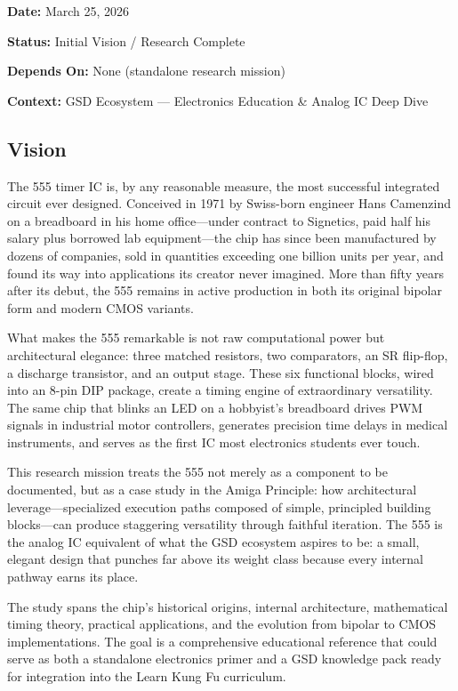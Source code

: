 \documentclass[11pt,letterpaper]{article}
\newcommand{\metafield}[2]{\textbf{\sffamily #1} #2\par}
\begin{document}
\metafield{Date:}{March 25, 2026}
\metafield{Status:}{Initial Vision / Research Complete}
\metafield{Depends On:}{None (standalone research mission)}
\metafield{Context:}{GSD Ecosystem --- Electronics Education \& Analog IC Deep Dive}

\subsection{Vision}

The 555 timer IC is, by any reasonable measure, the most successful integrated circuit ever designed. Conceived in 1971 by Swiss-born engineer Hans Camenzind on a breadboard in his home office---under contract to Signetics, paid half his salary plus borrowed lab equipment---the chip has since been manufactured by dozens of companies, sold in quantities exceeding one billion units per year, and found its way into applications its creator never imagined. More than fifty years after its debut, the 555 remains in active production in both its original bipolar form and modern CMOS variants.

What makes the 555 remarkable is not raw computational power but architectural elegance: three matched resistors, two comparators, an SR flip-flop, a discharge transistor, and an output stage. These six functional blocks, wired into an 8-pin DIP package, create a timing engine of extraordinary versatility. The same chip that blinks an LED on a hobbyist's breadboard drives PWM signals in industrial motor controllers, generates precision time delays in medical instruments, and serves as the first IC most electronics students ever touch.

This research mission treats the 555 not merely as a component to be documented, but as a case study in the Amiga Principle: how architectural leverage---specialized execution paths composed of simple, principled building blocks---can produce staggering versatility through faithful iteration. The 555 is the analog IC equivalent of what the GSD ecosystem aspires to be: a small, elegant design that punches far above its weight class because every internal pathway earns its place.

The study spans the chip's historical origins, internal architecture, mathematical timing theory, practical applications, and the evolution from bipolar to CMOS implementations. The goal is a comprehensive educational reference that could serve as both a standalone electronics primer and a GSD knowledge pack ready for integration into the Learn Kung Fu curriculum.
\end{document}
